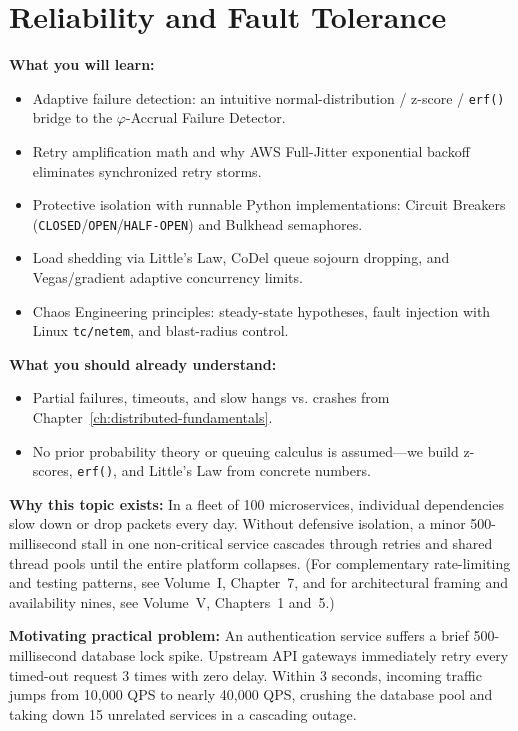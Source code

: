 \chapter{Reliability and Fault Tolerance}
\label{ch:reliability-fault-tolerance}

\begin{chaptergoalsbox}
\textbf{What you will learn:}
\begin{itemize}[leftmargin=12pt]
  \item Adaptive failure detection: an intuitive normal-distribution / z-score / \texttt{erf()} bridge to the $\varphi$-Accrual Failure Detector.
  \item Retry amplification math and why AWS Full-Jitter exponential backoff eliminates synchronized retry storms.
  \item Protective isolation with runnable Python implementations: Circuit Breakers (\texttt{CLOSED}/\texttt{OPEN}/\texttt{HALF-OPEN}) and Bulkhead semaphores.
  \item Load shedding via Little's Law, CoDel queue sojourn dropping, and Vegas/gradient adaptive concurrency limits.
  \item Chaos Engineering principles: steady-state hypotheses, fault injection with Linux \texttt{tc/netem}, and blast-radius control.
\end{itemize}

\textbf{What you should already understand:}
\begin{itemize}[leftmargin=12pt]
  \item Partial failures, timeouts, and slow hangs vs. crashes from Chapter~\ref{ch:distributed-fundamentals}.
  \item No prior probability theory or queuing calculus is assumed---we build z-scores, \texttt{erf()}, and Little's Law from concrete numbers.
\end{itemize}

\textbf{Why this topic exists:}
In a fleet of 100 microservices, individual dependencies slow down or drop packets every day. Without defensive isolation, a minor 500-millisecond stall in one non-critical service cascades through retries and shared thread pools until the entire platform collapses. (For complementary rate-limiting and testing patterns, see Volume~I, Chapter~7, and for architectural framing and availability nines, see Volume~V, Chapters~1 and~5.)

\textbf{Motivating practical problem:}
An authentication service suffers a brief 500-millisecond database lock spike. Upstream API gateways immediately retry every timed-out request 3 times with zero delay. Within 3 seconds, incoming traffic jumps from 10,000 QPS to nearly 40,000 QPS, crushing the database pool and taking down 15 unrelated services in a cascading outage.
\end{chaptergoalsbox}

